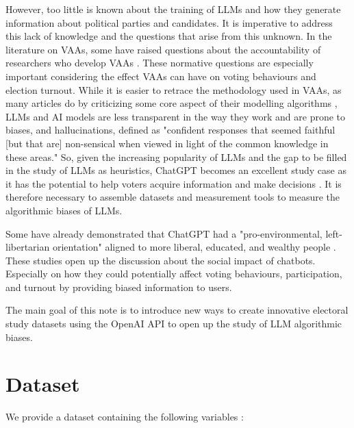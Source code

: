\documentclass{article}
\begin{document}
However, too little is known about the training of LLMs and how they generate information about political parties and candidates. It is imperative to address this lack of knowledge and the questions that arise from this unknown. In the literature on VAAs, some have raised questions about the accountability of researchers who develop VAAs \parencite{ladner_etal10, romeromoreno_etal22}. These normative questions are especially important considering the effect VAAs can have on voting behaviours and election turnout. While it is easier to retrace the methodology used in VAAs, as many articles do by criticizing some core aspect of their modelling algorithms \parencite{vanderlinden_dufresne17, louwerse_rosema14, romeromoreno_etal22}, LLMs and AI models are less transparent in the way they work and are prone to biases, and hallucinations, defined as "confident responses that seemed faithful [but that are] non-sensical when viewed in light of the common knowledge in these areas." \parencite{alkaissi_mcfarlane23} So, given the increasing popularity of LLMs and the gap to be filled in the study of LLMs as heuristics, ChatGPT becomes an excellent study case as it has the potential to help voters acquire information and make decisions \parencite{hartmann_etal23}. It is therefore necessary to assemble datasets and measurement tools to measure the algorithmic biases of LLMs.\par

Some have already demonstrated that ChatGPT had a "pro-environmental, left-libertarian orientation" aligned to more liberal, educated, and wealthy people \parencite{hartmann_etal23, santurkar_etal23, rutinowski_etal23, kim_lee23}. These studies open up the discussion about the social impact of chatbots. Especially on how they could potentially affect voting behaviours, participation, and turnout by providing biased information to users. \par

The main goal of this note is to introduce new ways to create innovative electoral study datasets using the OpenAI API to open up the study of LLM algorithmic biases.

\section{Dataset}

We provide a dataset containing the following variables :
\end{document}
